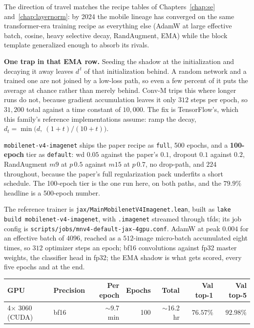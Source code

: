 \noindent The direction of travel matches the recipe tables of
Chapters~\ref{chap:se} and~\ref{chap:layernorm}: by 2024 the mobile
lineage has converged on the same transformer-era training
recipe as everything else (AdamW at large effective batch,
cosine, heavy selective decay, RandAugment, EMA) while the block
template generalized enough to absorb its rivals.

\textbf{One trap in that EMA row.} Seeding the shadow at the
initialization and decaying it away leaves $d^{\,t}$ of that
initialization behind. A random network and a trained one are not
joined by a low-loss path, so even a few percent of it puts the
average at chance rather than merely behind. Conv-M trips this
where longer runs do not, because gradient accumulation leaves it only
$312$ steps per epoch, so $31{,}200$ total against a time constant of
$10{,}000$. The fix is TensorFlow's, which this family's reference
implementations assume: ramp the decay,
$d_t = \min\!\big(d,\ (1+t)/(10+t)\big)$.

\texttt{mobilenet-v4-imagenet} ships the paper recipe as
\texttt{full}, 500 epochs, and a \textbf{100-epoch} tier as
\texttt{default}: wd $0.05$ against the paper's $0.1$, dropout $0.1$
against $0.2$, RandAugment $m9$ at $p\,0.5$ against $m15$ at $p\,0.7$, no
drop-path, and $224$ throughout, because the paper's full regularization pack
underfits a short schedule. The 100-epoch tier is the one run here, on
both paths, and the $79.9\%$ headline is a 500-epoch number.


The reference trainer is \texttt{jax/MainMobilenetV4Imagenet.lean},
built as \texttt{lake build mobilenet-v4-imagenet}, with
\texttt{.imagenet} streamed through tfds; its job config is
\texttt{scripts/jobs/mnv4-default-jax-4gpu.conf}. AdamW at peak
$0.004$ for an effective batch of $4096$, reached as a $512$-image
micro-batch accumulated eight times, so $312$ optimizer steps an epoch;
bf16 convolutions against fp32 master weights, the classifier head in
fp32; the EMA
shadow is what gets scored, every five epochs and at the end.

\begin{center}
\begin{tabular}{l l r r r r r}
\hline
GPU & Precision & Per epoch & Epochs & Total & Val top-1 & Val top-5 \\
\hline
4$\times$ 3060 (CUDA) & bf16 & $\sim$9.7 min & 100 & $\sim$16.2 hr & $\mathbf{76.57\%}$ & $\mathbf{92.98\%}$ \\
\hline
\end{tabular}
\end{center}


